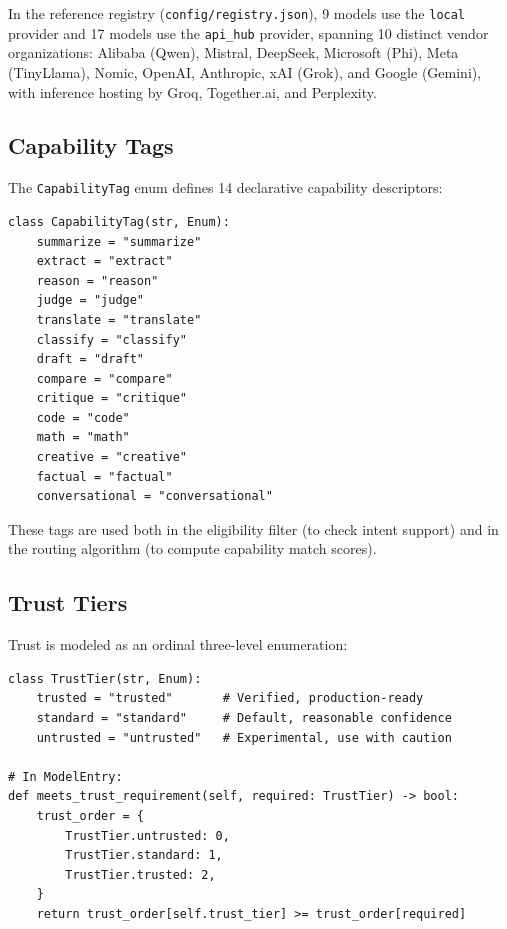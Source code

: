 \documentclass[11pt,a4paper]{article}
\theoremstyle{plain}
\theoremstyle{definition}
\begin{document}
In the reference registry (\texttt{config/registry.json}), 9 models use the
\texttt{local} provider and 17 models use the \texttt{api\_hub} provider,
spanning 10 distinct vendor organizations: Alibaba (Qwen), Mistral, DeepSeek,
Microsoft (Phi), Meta (TinyLlama), Nomic, OpenAI, Anthropic, xAI (Grok), and
Google (Gemini), with inference hosting by Groq, Together.ai, and Perplexity.

\subsection{Capability Tags}

The \texttt{CapabilityTag} enum defines 14 declarative capability descriptors:

\begin{lstlisting}[style=pythonstyle, caption={CapabilityTag enum from \texttt{schema.py}}]
class CapabilityTag(str, Enum):
    summarize = "summarize"
    extract = "extract"
    reason = "reason"
    judge = "judge"
    translate = "translate"
    classify = "classify"
    draft = "draft"
    compare = "compare"
    critique = "critique"
    code = "code"
    math = "math"
    creative = "creative"
    factual = "factual"
    conversational = "conversational"
\end{lstlisting}

These tags are used both in the eligibility filter (to check intent support) and
in the routing algorithm (to compute capability match scores).

\subsection{Trust Tiers}

Trust is modeled as an ordinal three-level enumeration:

\begin{lstlisting}[style=pythonstyle, caption={TrustTier enum and ordinal comparison from \texttt{schema.py}}]
class TrustTier(str, Enum):
    trusted = "trusted"       # Verified, production-ready
    standard = "standard"     # Default, reasonable confidence
    untrusted = "untrusted"   # Experimental, use with caution

# In ModelEntry:
def meets_trust_requirement(self, required: TrustTier) -> bool:
    trust_order = {
        TrustTier.untrusted: 0,
        TrustTier.standard: 1,
        TrustTier.trusted: 2,
    }
    return trust_order[self.trust_tier] >= trust_order[required]
\end{lstlisting}
\end{document}
